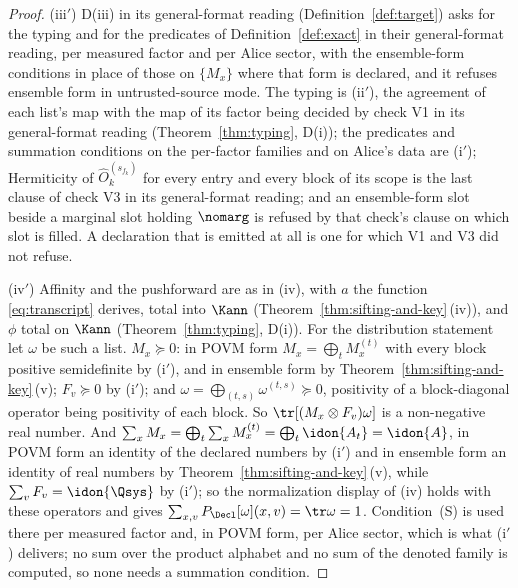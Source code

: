\begin{proof}
(iii$'$) D(iii) in its general-format reading (Definition~\ref{def:target})
asks for the typing and for the predicates of Definition~\ref{def:exact} in
their general-format reading, per measured factor and per Alice sector, with
the ensemble-form conditions in place of those on $\{M_x\}$ where that form is
declared, and it refuses ensemble form in untrusted-source mode. The typing
is (ii$'$), the agreement of each list's map with the map of its factor being
decided by check V1 in its general-format reading (Theorem~\ref{thm:typing},
D(i)); the predicates and summation conditions on the per-factor families and
on Alice's data are (i$'$); Hermiticity of $\hat O^{(s_{f_k})}_k$ for every
entry and every block of its scope is the last clause of check V3 in its
general-format reading; and an ensemble-form slot beside a marginal slot
holding $\nomarg$ is refused by that check's clause on which slot is filled.
A declaration that is emitted at all is one for which V1 and V3 did not
refuse.

(iv$'$) Affinity and the pushforward are as in (iv), with $a$ the function
\eqref{eq:transcript} derives, total into $\Kann$
(Theorem~\ref{thm:sifting-and-key}\,(iv)), and $\phi$ total on $\Kann$
(Theorem~\ref{thm:typing}, D(i)). For the distribution statement let $\omega$
be such a list. $M_x\succeq0$: in POVM form $M_x=\bigoplus_tM^{(t)}_x$ with
every block positive semidefinite by (i$'$), and in ensemble form by
Theorem~\ref{thm:sifting-and-key}\,(v); $F_v\succeq0$ by (i$'$); and
$\omega=\bigoplus_{(t,s)}\omega^{(t,s)}\succeq0$, positivity of a
block-diagonal operator being positivity of each block. So
$\tr[(M_x\otimes F_v)\omega]$ is a non-negative real number. And
$\sum_xM_x=\bigoplus_t\sum_xM^{(t)}_x=\bigoplus_t\idon{A_t}=\idon{A}$, in POVM
form an identity of the declared numbers by (i$'$) and in ensemble form an
identity of real numbers by Theorem~\ref{thm:sifting-and-key}\,(v), while
$\sum_vF_v=\idon{\Qsys}$ by (i$'$); so the normalization display of (iv) holds
with these operators and gives $\sum_{x,v}P_{\Decl}[\omega](x,v)=\tr\omega=1$.
Condition~(S) is used there per measured factor and, in POVM form, per Alice
sector, which is what (i$'$) delivers; no sum over the product alphabet and no
sum of the denoted family is computed, so none needs a summation condition.
\end{proof}
